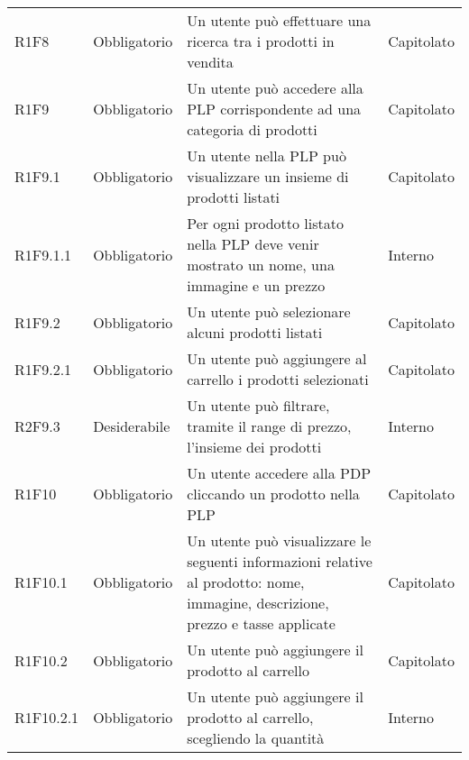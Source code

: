 {\begin{longtable}{C{2.5cm} C{2.8cm} C{6.7cm} C{2.5cm}}

R1F8 & Obbligatorio & Un utente può effettuare una ricerca tra i prodotti in vendita & Capitolato \\


R1F9 & Obbligatorio & Un utente può accedere alla PLP corrispondente ad una categoria di prodotti & Capitolato \\
R1F9.1 & Obbligatorio & Un utente nella PLP può visualizzare un insieme di prodotti listati & Capitolato \\
R1F9.1.1 & Obbligatorio & Per ogni prodotto listato nella PLP deve venir mostrato un nome, una immagine e un prezzo & Interno \\
R1F9.2 & Obbligatorio & Un utente può selezionare alcuni prodotti listati & Capitolato \\
R1F9.2.1 & Obbligatorio & Un utente può aggiungere al carrello i prodotti selezionati & Capitolato \\
R2F9.3 & Desiderabile & Un utente può filtrare, tramite il range di prezzo, l'insieme dei prodotti & Interno \\


R1F10 & Obbligatorio & Un utente accedere alla PDP cliccando un prodotto nella PLP & Capitolato \\
R1F10.1 & Obbligatorio & Un utente può visualizzare le seguenti informazioni relative al prodotto: nome, immagine, descrizione, prezzo e tasse applicate & Capitolato \\
R1F10.2 & Obbligatorio & Un utente può aggiungere il prodotto al carrello & Capitolato \\
R1F10.2.1 & Obbligatorio & Un utente può aggiungere il prodotto al carrello, scegliendo la quantità & Interno \\

\end{longtable}

}